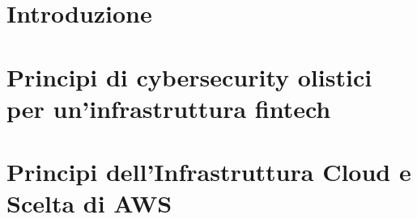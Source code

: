 \documentclass[a4paper,12pt]{report}
\begin{document}
\setcounter{tocdepth}{2} %
\tableofcontents
\listoffigures %

\chapter{Introduzione}
\label{chapter:introduzione}


\chapter{Principi di cybersecurity olistici \allowbreak{} per un'infrastruttura fintech}
\label{ch:principi-cybersecurity}


\chapter{Principi dell'Infrastruttura Cloud e Scelta di AWS}
\label{ch:cloud-aws}


%
\printbibliography
% 
\end{document}
